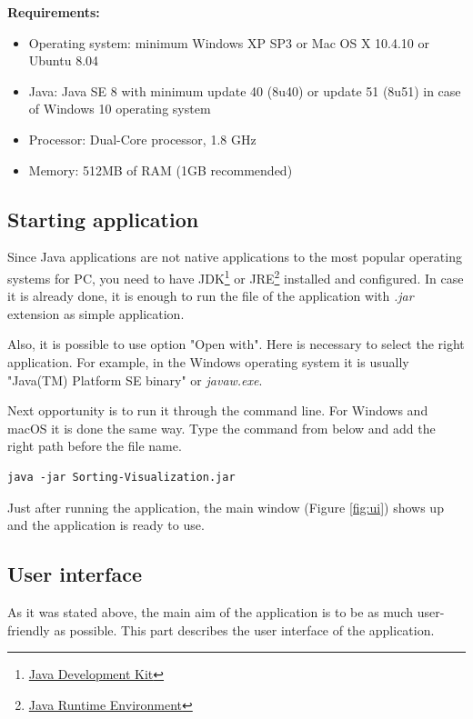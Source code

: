 \documentclass[
  field=inf,
  biblatex,
  language=english,
  glossaries,
  theorems=false,
  sourcecodes=false,
  index
]{kidiplom}
\begin{document}
\noindent \textbf{Requirements:}
\begin{itemize}
	\item Operating system: minimum Windows XP SP3 or Mac OS X 10.4.10 or Ubuntu 8.04 
	\item Java: Java SE 8 with minimum update 40 (8u40) or update 51 (8u51) in case of Windows 10 operating system
	\item Processor: Dual-Core processor, 1.8 GHz
	\item Memory: 512MB of RAM (1GB recommended)
\end{itemize}

\subsection{Starting application}

Since Java applications are not native applications to the most popular operating systems for PC, you need to have JDK\footnote{\href{https://www.oracle.com/technetwork/java/javase/jdk-8-readme-2095712.html}{Java Development Kit}} or JRE\footnote{\href{https://www.w3schools.in/java-tutorial/jre/}{Java Runtime Environment}} installed and configured. In case it is already done, it is enough to run the file of the application with \textit{.jar} extension as simple application.

Also, it is possible to use option "Open with". Here is necessary to select the right application. For example, in the Windows operating system it is usually "Java(TM) Platform SE binary" or \textit{javaw.exe}.

Next opportunity is to run it through the command line. For Windows and macOS it is done the same way. Type the command from below and add the right path before the file name. 
\begin{lstlisting}
java -jar Sorting-Visualization.jar
\end{lstlisting}

Just after running the application, the main window (Figure \ref{fig:ui}) shows up and the application is ready to use.

\subsection{User interface}

As it was stated above, the main aim of the application is to be as much user-friendly as possible. This part describes the user interface of the application.
\end{document}
